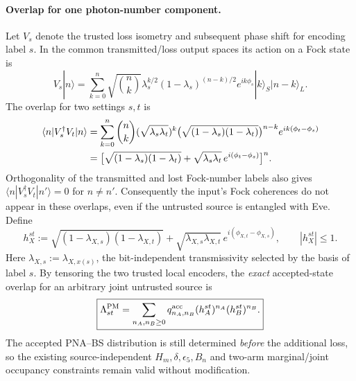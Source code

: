 \documentclass[11pt]{article}
\theoremstyle{remark}
\begin{document}
\paragraph{Overlap for one photon-number component.}
Let \(V_s\) denote the trusted loss isometry and subsequent phase
shift for encoding label \(s\).  In the common transmitted/loss
output spaces its action on a Fock state is
\begin{equation}
  V_s|n\rangle
  =
  \sum_{k=0}^{n}\sqrt{\binom nk}
  \lambda_s^{k/2}(1-\lambda_s)^{(n-k)/2}
  e^{ik\phi_s}
  |k\rangle_S|n-k\rangle_L .
  \label{eq:stage5a-pm-isometry}
\end{equation}
The overlap for two settings \(s,t\) is
\begin{align}
  \langle n|V_s^\dagger V_t|n\rangle
  &=
  \sum_{k=0}^{n}\binom nk
  (\sqrt{\lambda_s\lambda_t})^k
  \bigl(\sqrt{(1-\lambda_s)(1-\lambda_t)}\bigr)^{n-k}
  e^{ik(\phi_t-\phi_s)}
  \notag\\
  &=\bigl[
  \sqrt{(1-\lambda_s)(1-\lambda_t)}
  +\sqrt{\lambda_s\lambda_t}\,
    e^{i(\phi_t-\phi_s)}
  \bigr]^n.
  \label{eq:stage5a-pm-kernel}
\end{align}
Orthogonality of the transmitted and lost Fock-number labels also
gives \(\langle n|V_s^\dagger V_t|n'\rangle=0\) for \(n\ne n'\).
Consequently the input's Fock coherences do not appear in these
overlaps, even if the untrusted source is entangled with Eve.
Define
\begin{equation}
  h_X^{st}:=
  \sqrt{(1-\lambda_{X,s})(1-\lambda_{X,t})}
  +\sqrt{\lambda_{X,s}\lambda_{X,t}}\,
     e^{i(\phi_{X,t}-\phi_{X,s})},
  \qquad |h_X^{st}|\le1 .
  \label{eq:stage5a-pm-h}
\end{equation}
Here \(\lambda_{X,s}:=\lambda_{X,x(s)}\), the bit-independent
transmissivity selected by the basis of label \(s\).
By tensoring the two trusted local encoders, the \emph{exact}
accepted-state overlap for an arbitrary joint untrusted source is
\begin{equation}
  \boxed{
  \Lambda_{st}^{\rm PM}
  =
  \sum_{n_A,n_B\ge0}
  q_{n_A,n_B}^{\rm acc}
  (h_A^{st})^{n_A}(h_B^{st})^{n_B}.
  }
  \label{eq:stage5a-pm-exact-overlap}
\end{equation}
The accepted PNA--BS distribution is still determined \emph{before}
the additional loss, so the existing source-independent
\(H_m,\delta,\epsilon_5,B_n\) and two-arm marginal/joint occupancy
constraints remain valid without modification.
\end{document}
